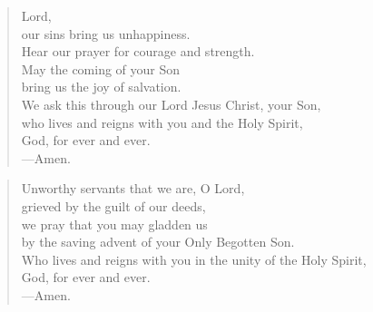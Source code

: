 \prayer

\setlength{\vleftmargin}{\prayerleftmargini}

\begin{verse}
Lord,\\
our sins bring us unhappiness.\\
Hear our prayer for courage and strength.\\
May the coming of your Son\\
bring us the joy of salvation.\\
We ask this through our Lord Jesus Christ, your Son,\\
who lives and reigns with you and the Holy Spirit,\\
God, for ever and ever.\\
{\color{red}---\thinspace}Amen.
\end{verse}


\begin{verse}
Unworthy servants that we are, O Lord,\\
grieved by the guilt of our deeds,\\
 we pray that you may gladden us\\
by the saving advent of your Only Begotten Son.\\
Who lives and reigns with you in the unity of the Holy Spirit,\\
God, for ever and ever.\\
{\color{red}---\thinspace}Amen.
\end{verse}

\setlength{\vleftmargin}{\defleftmargini}